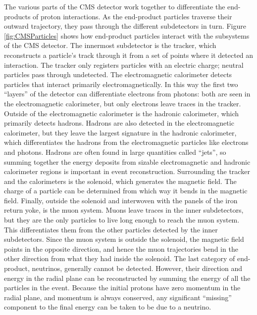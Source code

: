 The various parts of the CMS detector work together to differentiate
the end-products of proton interactions.  
As the end-product particles traverse their outward trajectory,
they pass through the different subdetectors in turn.
Figure \ref{fig:CMSParticles} shows how end-product particles 
interact with the subsystems of the CMS detector.  
The innermost subdetector is the tracker, 
which reconstructs a particle's track through it
from a set of points where it detected an interaction.  
The tracker only registers particles with an electric charge;%
neutral particles pass through undetected.  
The electromagnetic calorimeter detects particles that interact
primarily electromagnetically.%
In this way the first two ``layers'' of the detector can differentiate
electrons from photons: 
both are seen in the electromagnetic calorimeter, 
but only electrons leave traces in the tracker.
Outside of the electromagnetic calorimeter is the hadronic calorimeter,
which primarily detects hadrons.  
Hadrons are also detected in the electromagnetic calorimeter,
but they leave the largest signature in the hadronic calorimeter,
which differentiates the hadrons from the electromagnetic particles
like electrons and photons.  
Hadrons are often found in large quantities called ``jets'',
so summing together the energy deposits from sizable electromagnetic 
and hadronic calorimeter regions is important in event reconstruction.  
Surrounding the tracker and the calorimeters is the solenoid,
which generates the magnetic field.
The charge of a particle can be determined from which way it
bends in the magnetic field.
Finally, outside the solenoid and interwoven with the panels of the 
iron return yoke, is the muon system.  
Muons leave traces in the inner subdetectors, 
but they are the only particles to live long enough to reach the
muon system.
This differentiates them from the other particles detected by 
the inner subdetectors.  
Since the muon system is outside the solenoid, 
the magnetic field points in the opposite direction,
and hence the muon trajectories bend in the other direction
from what they had inside the solenoid.  
The last category of end-product, neutrinos, 
generally cannot be detected.
However, their direction and energy in the radial plane 
can be reconstructed 
by summing the energy of all the particles in the event.
Because the initial protons have zero momentum in the radial plane, 
and momentum is always conserved, 
any significant ``missing'' component to the final energy
can be taken to be due to a neutrino.  

